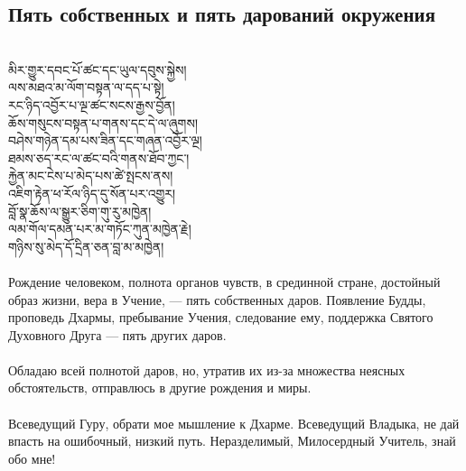 \subsection*{Пять собственных и пять дарований окружения}
\\
\ti
མིར་གྱུར་དབང་པོ་ཚང་དང་ཡུལ་དབུས་སྐྱེས།\\
ལས་མཐའ་མ་ལོག་བསྟན་ལ་དད་པ་སྟེ།\\
རང་ཉིད་འབྱོར་པ་ལྔ་ཚང་སངས་རྒྱས་བྱོན། \\
ཆོས་གསུངས་བསྟན་པ་གནས་དང་དེ་ལ་ཞུགས།\\
བཤེས་གཉེན་དམ་པས་ཟིན་དང་གཞན་འབྱོར་ལྔ།\\
ཐམས་ཅད་རང་ལ་ཚང་བའི་གནས་ཐོབ་ཀྱང༌།\\
རྐྱེན་མང་ངེས་པ་མེད་པས་ཚེ་སྤངས་ནས།\\
འཇིག་རྟེན་ཕ་རོལ་ཉིད་དུ་སོན་པར་འགྱུར།\\
བློ་སྣ་ཆོས་ལ་སྒྱུར་ཅིག་གུ་རུ་མཁྱེན།\\
ལམ་གོལ་དམན་པར་མ་གཏོང་ཀུན་མཁྱེན་རྗེ།\\
གཉིས་སུ་མེད་དོ་དྲིན་ཅན་བླ་མ་མཁྱེན།\\
\\
\ru
Рождение человеком, полнота органов чувств, в срединной стране,
достойный образ жизни, вера в Учение, —
пять собствен\-ных даров. Появление Будды,
проповедь Дхармы, пребывание Учения, следование ему,
поддержка Святого Духовного Друга — пять других даров.\\
 \\
Обладаю всей полнотой даров, но,
утратив их из-за множества неясных обстоятельств,
отправлюсь в другие рождения и миры.\\
\\
Всеведущий Гуру, обрати мое мышление к Дхарме.
Всеведущий Владыка, не дай впасть на ошибочный, низкий путь.
Нераздели\-мый, Милосердный Учитель, знай обо мне!

\newpage

